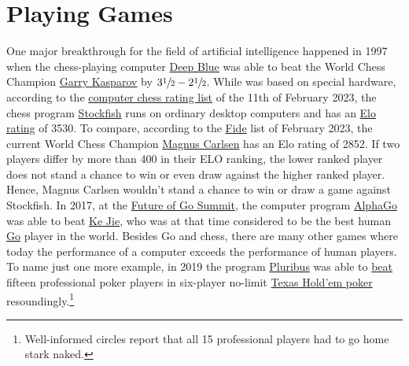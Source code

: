 \chapter{Playing Games}
One major breakthrough for the field of artificial intelligence happened in 1997 when the chess-playing computer
\href{https://en.wikipedia.org/wiki/Deep_Blue_(chess_computer)}{Deep Blue} was able to beat the World Chess
Champion \href{https://en.wikipedia.org/wiki/Garry_Kasparov}{Garry Kasparov} by $3\sfrac{1}{2}-2\sfrac{1}{2}$.
While   was based on special hardware, according to the
\href{http://www.computerchess.org.uk/ccrl/4040/rating_list_all.html}{computer chess rating list} of the 11th
of February 2023, the chess program \href{https://en.wikipedia.org/wiki/Stockfish_(chess)}{Stockfish} runs
on ordinary desktop computers and has an \href{https://en.wikipedia.org/wiki/Elo_rating_system}{Elo rating} of 3530.  
To compare, according to the
\href{https://ratings.fide.com/top.phtml?list=men}{Fide} list of February 2023, the current 
World Chess Champion \href{https://en.wikipedia.org/wiki/Magnus_Carlsen}{Magnus Carlsen} has an Elo rating of
2852.  If two players differ by more than 400 in their ELO ranking, the lower ranked player does not stand a
chance to win or even draw against the higher ranked player. Hence, Magnus Carlsen wouldn't stand a chance to
win or draw a game against Stockfish.  In 2017, at the  
\href{https://en.wikipedia.org/wiki/Future_of_Go_Summit}{Future of Go Summit},  the computer program
\href{https://en.wikipedia.org/wiki/AlphaGo}{AlphaGo}  was able to beat
\href{https://en.wikipedia.org/wiki/Ke_Jie}{Ke Jie},  
who was at that time considered to be the best human
\href{https://en.wikipedia.org/wiki/Go_(game)}{Go} player in the world. 
Besides Go and chess, there are many other games where today the performance of a computer exceeds the
performance of human players.  To name just one more example, in 2019 the program
\href{https://en.wikipedia.org/wiki/Pluribus_(poker_bot)}{Pluribus}  was able to  
\href{https://arstechnica.com/science/2019/07/facebook-ai-pluribus-defeats-top-poker-professionals-in-6-player-texas-holdem/}{beat}
fifteen professional poker players in six-player no-limit 
\href{https://en.wikipedia.org/wiki/Texas_hold_%27em}{Texas Hold'em poker} resoundingly.\footnote{
  Well-informed circles report that all 15 professional players had to go home stark naked.
}


